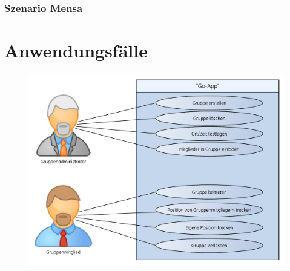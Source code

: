 \subsubsection{Szenario Mensa}

\section{Anwendungsfälle}
\begin{figure} [H]
	\centering
	\includegraphics[scale=0.8, trim=2cm 0 0 0cm]{res/anwendungsfall.pdf}
\end{figure}
%

